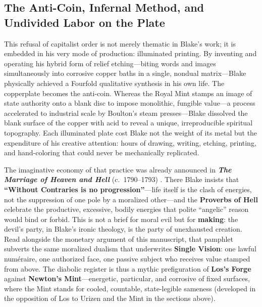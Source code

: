 \documentclass[
]{article}
\begin{document}
\subsection{The Anti-Coin, Infernal Method, and Undivided Labor on the
Plate}\label{the-anti-coin-infernal-method-and-undivided-labor-on-the-plate}

This refusal of capitalist order is not merely thematic in Blake's work;
it is embedded in his very mode of production: illuminated printing. By
inventing and operating his hybrid form of relief etching---biting words
and images simultaneously into corrosive copper baths in a single,
nondual matrix---Blake physically achieved a Fourfold qualitative
synthesis in his own life. The copperplate becomes the anti-coin.
Whereas the Royal Mint stamps an image of state authority onto a blank
disc to impose monolithic, fungible value---a process accelerated to
industrial scale by Boulton's steam presses---Blake dissolved the blank
surface of the copper with acid to reveal a unique, irreproducible
spiritual topography. Each illuminated plate cost Blake not the weight
of its metal but the expenditure of his creative attention: hours of
drawing, writing, etching, printing, and hand-coloring that could never
be mechanically replicated.

The imaginative economy of that practice was already announced in
\textbf{\emph{The Marriage of Heaven and Hell}} (c.~1790--1793)
\citep{blake1790marriage, erdman1988complete}. There Blake insists that
\textbf{``Without Contraries is no progression''}---life itself is the
clash of energies, not the suppression of one pole by a moralized
other---and the \textbf{Proverbs of Hell} celebrate the productive,
excessive, bodily energies that polite ``angelic'' reason would bind or
forbid. This is not a brief for moral evil but for \textbf{making}: the
devil's party, in Blake's ironic theology, is the party of unexhausted
creation. Read alongside the monetary argument of this manuscript, that
pamphlet subverts the same moralized dualism that underwrites
\textbf{Single Vision}: one lawful numéraire, one authorized face, one
passive subject who receives value stamped from above. The diabolic
register is thus a mythic prefiguration of \textbf{Los's Forge} against
\textbf{Newton's Mint}---energetic, particular, and corrosive of fixed
surfaces, where the Mint stands for cooled, countable, state-legible
sameness (developed in the opposition of Los to Urizen and the Mint in
the sections above).
\end{document}

